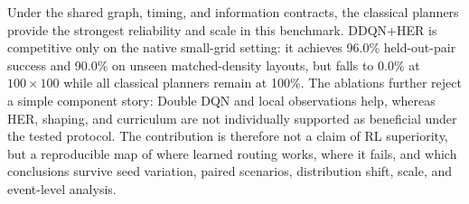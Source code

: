 Under the shared graph, timing, and information contracts, the classical planners provide the strongest reliability and scale in this benchmark. DDQN+HER is competitive only on the native small-grid setting: it achieves 96.0\% held-out-pair success and 90.0\% on unseen matched-density layouts, but falls to 0.0\% at $100\times100$ while all classical planners remain at 100\%. The ablations further reject a simple component story: Double DQN and local observations help, whereas HER, shaping, and curriculum are not individually supported as beneficial under the tested protocol. The contribution is therefore not a claim of RL superiority, but a reproducible map of where learned routing works, where it fails, and which conclusions survive seed variation, paired scenarios, distribution shift, scale, and event-level analysis.
